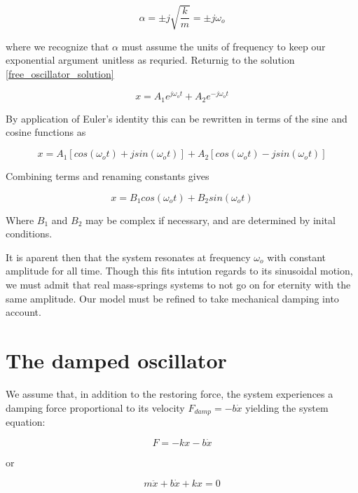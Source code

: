 \documentclass[11pt]{book}
\begin{document}
\begin{equation*}
  \alpha = \pm j \sqrt{\frac{k}{m}} = \pm j \omega_o
\end{equation*}

where we recognize that $\alpha$ must assume the units of frequency to
keep our exponential argument unitless as requried.  Returnig to the
solution \eqref{free_oscillator_solution}

\begin{equation*}
  x = A_1e^{j\omega_o t} + A_2e^{-j\omega_o t}
\end{equation*}

By application of Euler's identity this can be rewritten in terms of
the sine and cosine functions as

\begin{equation*}
  x = A_1[cos(\omega_o t) + j sin(\omega_o t)] + A_2[cos(\omega_o t) - j sin(\omega_o t)]
\end{equation*}

Combining terms and renaming constants gives

\begin{equation*}
  x = B_1cos(\omega_o t) + B_2sin(\omega_o t)
\end{equation*}

Where $B_1$ and $B_2$ may be complex if necessary, and are determined
by inital conditions.

It is aparent then that the system resonates at frequency $\omega_o$
with constant amplitude for all time.  Though this fits intution
regards to its sinusoidal motion, we must admit that real mass-springs
systems to not go on for eternity with the same amplitude.  Our model
must be refined to take mechanical damping into account.

\section* {The damped oscillator}  

We assume that, in addition to the restoring force, the system
experiences a damping force proportional to its velocity
$F_{damp} = -b\dot x$ yielding the system equation:

\begin{equation*}
  F = -kx -b \dot x
\end{equation*}

or

\begin{equation}
  \label{damped_oscillator_system_equation}
  m \ddot x + b \dot x + kx = 0
\end{equation}
\end{document}
